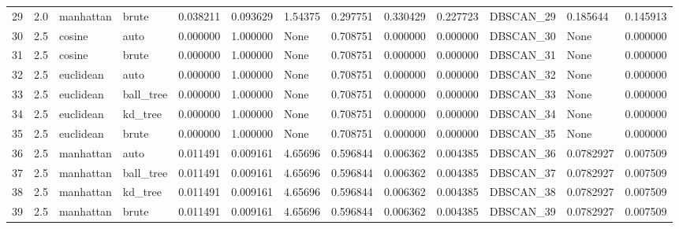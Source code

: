 \begin{tabular}{lrllrrlrrrllr}
29 &  2.0 &  manhattan &      brute &             0.038211 &            0.093629 &              1.54375 &               0.297751 &           0.330429 &           0.227723 &  DBSCAN\_29 &         0.185644 &         0.145913 \\
30 &  2.5 &     cosine &       auto &             0.000000 &            1.000000 &                 None &               0.708751 &           0.000000 &           0.000000 &  DBSCAN\_30 &             None &         0.000000 \\
31 &  2.5 &     cosine &      brute &             0.000000 &            1.000000 &                 None &               0.708751 &           0.000000 &           0.000000 &  DBSCAN\_31 &             None &         0.000000 \\
32 &  2.5 &  euclidean &       auto &             0.000000 &            1.000000 &                 None &               0.708751 &           0.000000 &           0.000000 &  DBSCAN\_32 &             None &         0.000000 \\
33 &  2.5 &  euclidean &  ball\_tree &             0.000000 &            1.000000 &                 None &               0.708751 &           0.000000 &           0.000000 &  DBSCAN\_33 &             None &         0.000000 \\
34 &  2.5 &  euclidean &    kd\_tree &             0.000000 &            1.000000 &                 None &               0.708751 &           0.000000 &           0.000000 &  DBSCAN\_34 &             None &         0.000000 \\
35 &  2.5 &  euclidean &      brute &             0.000000 &            1.000000 &                 None &               0.708751 &           0.000000 &           0.000000 &  DBSCAN\_35 &             None &         0.000000 \\
36 &  2.5 &  manhattan &       auto &             0.011491 &            0.009161 &              4.65696 &               0.596844 &           0.006362 &           0.004385 &  DBSCAN\_36 &        0.0782927 &         0.007509 \\
37 &  2.5 &  manhattan &  ball\_tree &             0.011491 &            0.009161 &              4.65696 &               0.596844 &           0.006362 &           0.004385 &  DBSCAN\_37 &        0.0782927 &         0.007509 \\
38 &  2.5 &  manhattan &    kd\_tree &             0.011491 &            0.009161 &              4.65696 &               0.596844 &           0.006362 &           0.004385 &  DBSCAN\_38 &        0.0782927 &         0.007509 \\
39 &  2.5 &  manhattan &      brute &             0.011491 &            0.009161 &              4.65696 &               0.596844 &           0.006362 &           0.004385 &  DBSCAN\_39 &        0.0782927 &         0.007509 \\
\bottomrule
\end{tabular}
